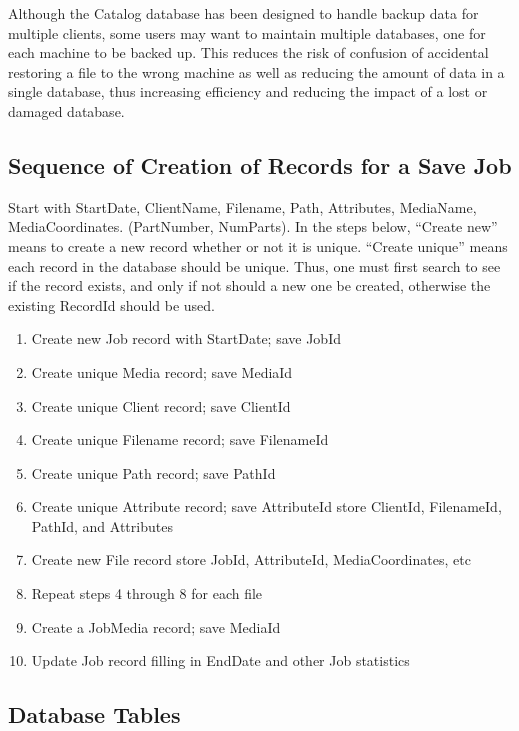 {{{Although the Catalog database has been designed to handle backup data for
multiple clients, some users may want to maintain multiple databases, one for
each machine to be backed up. This reduces the risk of confusion of accidental
restoring a file to the wrong machine as well as reducing the amount of data
in a single database, thus increasing efficiency and reducing the impact of a
lost or damaged database. 

\subsection*{Sequence of Creation of Records for a Save Job}

Start with StartDate, ClientName, Filename, Path, Attributes, MediaName,
MediaCoordinates. (PartNumber, NumParts). In the steps below, ``Create new''
means to create a new record whether or not it is unique. ``Create unique''
means each record in the database should be unique. Thus, one must first
search to see if the record exists, and only if not should a new one be
created, otherwise the existing RecordId should be used. 

\begin{enumerate}
\item Create new Job record with StartDate; save JobId  
\item Create unique Media record; save MediaId  
\item Create unique Client record; save ClientId  
\item Create unique Filename record; save FilenameId  
\item Create unique Path record; save PathId  
\item Create unique Attribute record; save AttributeId  
   store ClientId, FilenameId, PathId, and Attributes  
\item Create new File record  
   store JobId, AttributeId, MediaCoordinates, etc  
\item Repeat steps 4 through 8 for each file  
\item Create a JobMedia record; save MediaId  
\item Update Job record filling in EndDate and other Job statistics 
   \end{enumerate}

\subsection*{Database Tables}

}}}
